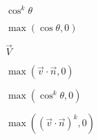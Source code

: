 \documentclass{article}
\begin{document}
$ \cos^k \theta $
\pagebreak

$\max(\cos \theta,0)$
\pagebreak

$\vec{V}$
\pagebreak

$\max(\vec{v} \cdot \vec{n}, 0)$
\pagebreak

$\max(\cos^k \theta,0)$
\pagebreak

$\max((\vec{v} \cdot \vec{n})^k, 0)$
\pagebreak
\end{document}
